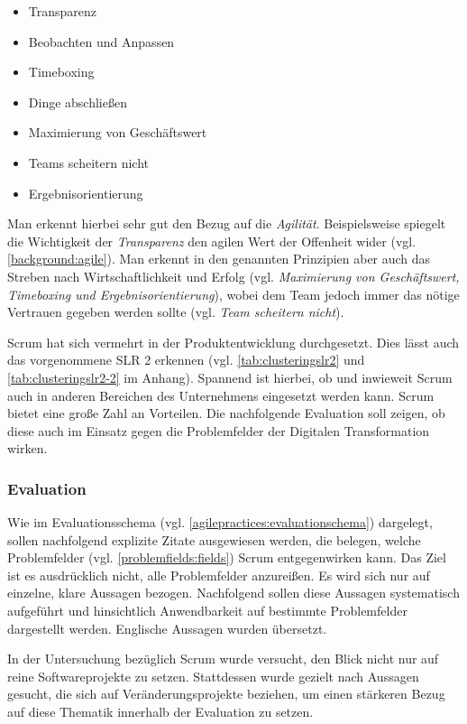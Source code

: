 \begin{itemize}[noitemsep, topsep=0pt]
	\item Transparenz
	\item Beobachten und Anpassen
	\item Timeboxing
	\item Dinge abschließen
	\item Maximierung von Geschäftswert
	\item Teams scheitern nicht
	\item Ergebnisorientierung
\end{itemize}

Man erkennt hierbei sehr gut den Bezug auf die \textit{Agilität}. Beispielsweise spiegelt die Wichtigkeit der \textit{Transparenz} den agilen Wert der Offenheit wider (vgl. \ref{background:agile}). Man erkennt in den genannten Prinzipien aber auch das Streben nach Wirtschaftlichkeit und Erfolg (vgl. \textit{Maximierung von Geschäftswert, Timeboxing und Ergebnisorientierung}), wobei dem Team jedoch immer das nötige Vertrauen gegeben werden sollte (vgl. \textit{Team scheitern nicht}).

Scrum hat sich vermehrt in der Produktentwicklung durchgesetzt. Dies lässt auch das vorgenommene SLR 2 erkennen (vgl. \ref{tab:clusteringslr2} und \ref{tab:clusteringslr2-2} im Anhang). Spannend ist hierbei, ob und inwieweit Scrum auch in anderen Bereichen des Unternehmens eingesetzt werden kann. Scrum bietet eine große Zahl an Vorteilen. Die nachfolgende Evaluation soll zeigen, ob diese auch im Einsatz gegen die Problemfelder der Digitalen Transformation wirken.

\subsubsection{Evaluation}

Wie im Evaluationsschema (vgl. \ref{agilepractices:evaluationschema}) dargelegt, sollen nachfolgend explizite Zitate ausgewiesen werden, die belegen, welche  Problemfelder (vgl. \ref{problemfields:fields}) Scrum entgegenwirken kann. Das Ziel ist es ausdrücklich nicht, alle Problemfelder anzureißen. Es wird sich nur auf einzelne, klare Aussagen bezogen. Nachfolgend sollen diese Aussagen systematisch aufgeführt und hinsichtlich Anwendbarkeit auf bestimmte Problemfelder dargestellt werden. Englische Aussagen wurden übersetzt.

In der Untersuchung bezüglich Scrum wurde versucht, den Blick nicht nur auf reine Softwareprojekte zu setzen. Stattdessen wurde gezielt nach Aussagen gesucht, die sich auf Veränderungsprojekte beziehen, um einen stärkeren Bezug auf diese Thematik innerhalb der Evaluation zu setzen. 

